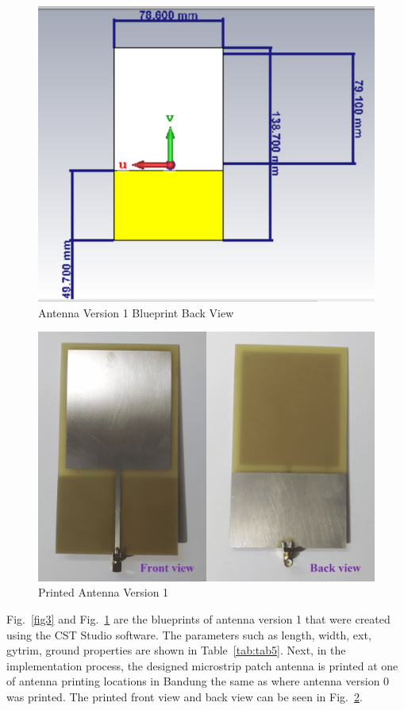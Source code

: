 \documentclass[conference]{IEEEtran}
\begin{document}
\begin{figure}[htbp]
    \centering
    \includegraphics[width=0.9\columnwidth]{tampak-belakang-antena2}
    \caption{Antenna Version 1 Blueprint Back View}
    \label{fig4}
\end{figure}

\begin{figure}[htbp]
  \centering
  \includegraphics[width=0.9\columnwidth]{figures/antenna_version_1}
  \caption{Printed Antenna Version 1}
  \label{fig:fig5}
\end{figure}

Fig.~\ref{fig3} and Fig.~\ref{fig4} are the blueprints of antenna version 1 that were created using the CST Studio software. The parameters such as length, width, ext, gytrim, ground properties are shown in Table~\ref{tab:tab5}. Next, in the implementation process, the designed microstrip patch antenna is printed at one of antenna printing locations in Bandung the same as where antenna version 0 was printed. The printed front view and back view can be seen in Fig.~\ref{fig:fig5}.
\end{document}
